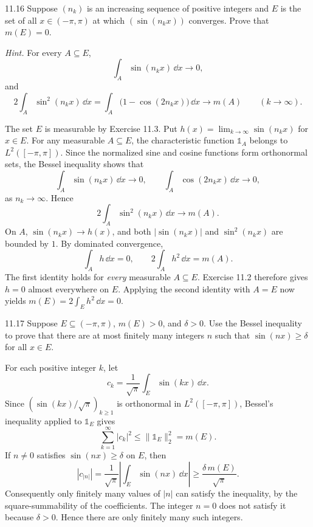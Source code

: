 \documentclass[11pt,oneside]{article}
\begin{document}
\begin{exercise}{11.16}
Suppose $(n_k)$ is an increasing sequence of positive integers and $E$ is the set of all $x\in(-\pi,\pi)$ at which $(\sin(n_kx))$ converges. Prove that $m(E)=0$.

\textit{Hint.} For every $A\subseteq E$,
\[
 \int_A\sin(n_kx)\,\dd x\to0,
\]
and
\[
 2\int_A\sin^2(n_kx)\,\dd x
 =\int_A\bigl(1-\cos(2n_kx)\bigr)\,\dd x
 \to m(A)\qquad(k\to\infty).
\]
\end{exercise}
\begin{solution}
The set $E$ is measurable by Exercise 11.3. Put $h(x)=\lim_{k\to\infty}\sin(n_kx)$ for $x\in E$. For any measurable $A\subseteq E$, the characteristic function $\mathds{1}_A$ belongs to $L^2([-\pi,\pi])$. Since the normalized sine and cosine functions form orthonormal sets, the Bessel inequality shows that
\[
 \int_A\sin(n_kx)\,\dd x\to0,
 \qquad\int_A\cos(2n_kx)\,\dd x\to0,
\]
as $n_k\to\infty$. Hence
\[
 2\int_A\sin^2(n_kx)\,\dd x\to m(A).
\]
On $A$, $\sin(n_kx)\to h(x)$, and both $|\sin(n_kx)|$ and $\sin^2(n_kx)$ are bounded by $1$. By dominated convergence,
\[
 \int_Ah\,\dd x=0,
 \qquad2\int_Ah^2\,\dd x=m(A).
\]
The first identity holds for \emph{every} measurable $A\subseteq E$. Exercise 11.2 therefore gives $h=0$ almost everywhere on $E$. Applying the second identity with $A=E$ now yields $m(E)=2\int_Eh^2\,\dd x=0$.
\end{solution}

\begin{exercise}{11.17}
Suppose $E\subseteq(-\pi,\pi)$, $m(E)>0$, and $\delta>0$. Use the Bessel inequality to prove that there are at most finitely many integers $n$ such that $\sin(nx)\ge\delta$ for all $x\in E$.
\end{exercise}
\begin{solution}
For each positive integer $k$, let
\[
 c_k=\frac1{\sqrt\pi}\int_E\sin(kx)\,\dd x.
\]
Since $(\sin(kx)/\sqrt\pi)_{k\ge1}$ is orthonormal in $L^2([-\pi,\pi])$, Bessel's inequality applied to $\mathds{1}_E$ gives
\[
 \sum_{k=1}^\infty|c_k|^2\le\|\mathds{1}_E\|_2^2=m(E).
\]
If $n\ne0$ satisfies $\sin(nx)\ge\delta$ on $E$, then
\[
 |c_{|n|}|=\frac1{\sqrt\pi}\left|\int_E\sin(nx)\,\dd x\right|
 \ge\frac{\delta\,m(E)}{\sqrt\pi}.
\]
Consequently only finitely many values of $|n|$ can satisfy the inequality, by the square-summability of the coefficients. The integer $n=0$ does not satisfy it because $\delta>0$. Hence there are only finitely many such integers.
\end{solution}
\end{document}
